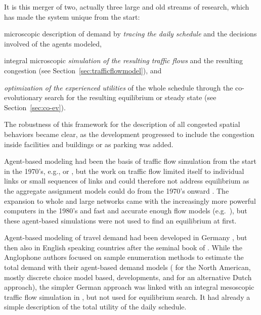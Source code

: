 
It is this merger of two, actually three large and old streams of research, which has made the system unique from the start: 
\begin{compactitem}
\item microscopic description of demand by \emph{tracing the daily schedule} and the decisions involved of the agents modeled, 
%
\item integral microscopic \emph{simulation of the resulting traffic flows} and the resulting congestion (see Section~\ref{sec:trafficflowmodel}), and
%
\item  \emph{optimization of the experienced utilities} of the whole schedule through the co-evolutionary search for the resulting equilibrium or steady state (see Section~\ref{sec:co-ev}). 
%
\end{compactitem}
The robustness of this framework for the description of all congested spatial behaviors became clear, as the development progressed to include the congestion inside facilities and buildings or as parking was added. 

Agent-based modeling had been the basis of traffic flow simulation from the start in the 1970’s, e.g., \citet[][]{Wiedemann_PhDThesis_1974} or \citet[][]{Seddon_Simulation_1972}, but the work on traffic flow limited itself to individual links or small sequences of links and could therefore not address equilibrium as the aggregate assignment models could do from the 1970’s onward \citep[see][]{OrtuzarWillumsen_2011}. The expansion to whole and large networks came with the increasingly more powerful computers in the 1980’s and fast and accurate enough flow models (e.g.\ \citet[][]{NagelSchreckenberg_JdPI_1992, Schwerdtfeger_VolmulerHamerslag_1984, Daganzo_TransResPartB_1994}), but these agent-based simulations were not used to find an equilibrium at first. 

Agent-based modeling of travel demand had been developed in Germany \citep[][]{AxhausenHerz_JTE_1989}, but then also in English speaking countries after the seminal book of \citet[][]{JonesEtAl_1983}.    
%
%
While the Anglophone authors focused on sample enumeration methods to estimate the total demand with their agent-based demand models (\citet[see][]{BradleyBowman_TRBTDF_2006} for the North American, mostly discrete choice model based, developments, and \citet[][]{ArentzeTimmermans_2000} for an alternative Dutch approach), the simpler German approach was linked with an integral mesoscopic traffic flow simulation in \citet[][]{Axhausen_PhDThesis_1988}, but not used for equilibrium search. It had already a simple description of the total utility of the daily schedule.

